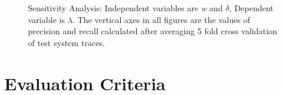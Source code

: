 \begin{figure}%
    \centering
    \qquad
    \caption{Sensitivity Analysis: Independent variables are \textit{w} and $\delta$, Dependent variable is $\lambda$. The vertical axes in all figures are the values of precision and recall calculated after averaging 5 fold cross validation of test system traces.}%
    \label{fig:sensitivityAnalysis_3}%
\end{figure}

\section{Evaluation Criteria}
\label{sec:metrics}

